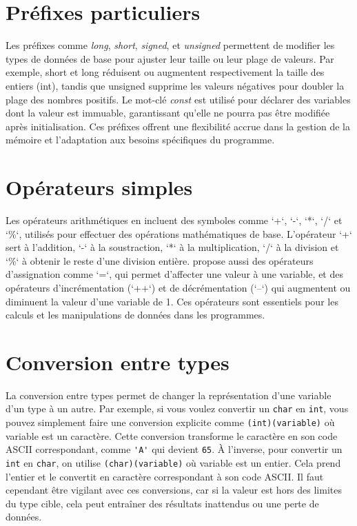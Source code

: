 



\section{Préfixes particuliers}
Les préfixes comme \emph{long}, \emph{short}, \emph{signed}, et \emph{unsigned} permettent de modifier les types de données de base pour ajuster leur taille ou leur plage de valeurs. Par exemple, short et long réduisent ou augmentent respectivement la taille des entiers (int), tandis que unsigned supprime les valeurs négatives pour doubler la plage des nombres positifs. Le mot-clé \emph{const} est utilisé pour déclarer des variables dont la valeur est immuable, garantissant qu’elle ne pourra pas être modifiée après initialisation. Ces préfixes offrent une flexibilité accrue dans la gestion de la mémoire et l’adaptation aux besoins spécifiques du programme.

\section{Opérateurs simples}
Les opérateurs arithmétiques en \cpp incluent des symboles comme `+`, `-`, `*`, `/` et `\%`, utilisés pour effectuer des opérations mathématiques de base. L'opérateur `+` sert à l'addition, `-` à la soustraction, `*` à la multiplication, `/` à la division et `\%` à obtenir le reste d'une division entière. \cpp propose aussi des opérateurs d'assignation comme `=`, qui permet d'affecter une valeur à une variable, et des opérateurs d'incrémentation (`++`) et de décrémentation (`--`) qui augmentent ou diminuent la valeur d'une variable de 1. Ces opérateurs sont essentiels pour les calculs et les manipulations de données dans les programmes.




\section{Conversion entre types}
La conversion entre types permet de changer la représentation d'une variable d’un type à un autre. Par exemple, si vous voulez convertir un \lstinline|char| en \lstinline|int|, vous pouvez simplement faire une conversion explicite comme \lstinline|(int)(variable)| où variable est un caractère. Cette conversion transforme le caractère en son code ASCII correspondant, comme \lstinline|'A'| qui devient \lstinline|65|. À l'inverse, pour convertir un \lstinline|int| en \lstinline|char|, on utilise \lstinline|(char)(variable)| où variable est un entier. Cela prend l'entier et le convertit en caractère correspondant à son code ASCII. Il faut cependant être vigilant avec ces conversions, car si la valeur est hors des limites du type cible, cela peut entraîner des résultats inattendus ou une perte de données.